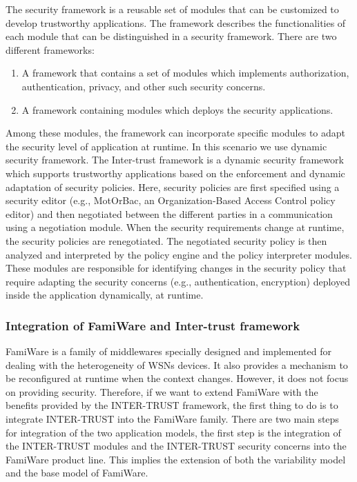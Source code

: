\documentclass[12pt,a4paper,twoside]{report}
\begin{document}
The security framework is a reusable set of modules that can be customized to develop trustworthy applications. The framework describes the functionalities of each module that can be distinguished in a security framework. There are two different frameworks:\par

\begin{enumerate}
	\item  A framework that contains a set of modules which implements authorization, authentication, privacy, and other such security concerns.
	\item A framework containing modules which deploys the security applications.
\end{enumerate}
Among these modules, the framework can incorporate specific modules to adapt the security level of application at runtime. In this scenario we use dynamic security framework.
The Inter-trust framework is a dynamic security framework \cite{ayed;etal:2013} which supports trustworthy applications based on the enforcement and dynamic adaptation of security policies. Here, security policies are first specified using a security editor (e.g., MotOrBac, an Organization-Based Access Control policy editor) and then negotiated between the different parties in a communication using a negotiation module. When the security requirements change at runtime, the security policies are renegotiated. The negotiated security policy is then analyzed and interpreted by the policy engine and the policy interpreter modules. These modules are responsible for identifying changes in the security policy that require adapting the security concerns (e.g., authentication, encryption) deployed inside the application dynamically, at runtime.\par

\subsubsection{Integration of FamiWare and Inter-trust framework}
FamiWare is a family of middlewares specially designed and implemented for dealing with the heterogeneity of WSNs devices. It also provides a mechanism to be reconfigured at runtime when the context changes. However, it does not focus on providing security. Therefore, if we want to extend FamiWare with the benefits provided by the INTER-TRUST framework, the first thing to do is to integrate INTER-TRUST into the FamiWare family. There are two main steps for integration of the two application models, the first step is the integration of the INTER-TRUST modules and the INTER-TRUST security concerns into the FamiWare product line. This implies the extension of both the variability model and the base model of FamiWare. \par
\end{document}
